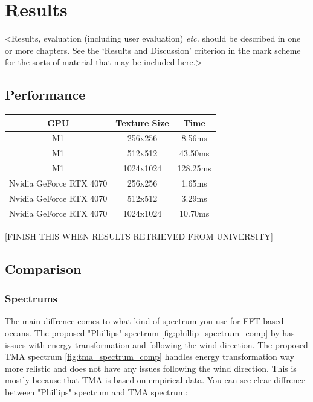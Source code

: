\justifying
\chapter{Results}
\label{chapter3}

<Results, evaluation (including user evaluation) {\em etc.} should be described in one or more chapters. See the `Results and Discussion' criterion in the mark scheme for the sorts of material that may be included here.>
\section{Performance}

\begin{table}[h]
    \centering
    \begin{tabular}{|c|c|c|}
        \hline
        \textbf{GPU} & \textbf{Texture Size} & \textbf{Time} \\
        \hline
        M1 & 256x256 & 8.56ms \\
        \hline
        M1 & 512x512 & 43.50ms \\
        \hline
        M1 & 1024x1024 & 128.25ms \\
        \hline
        Nvidia GeForce RTX 4070 & 256x256 & 1.65ms \\
        \hline
        Nvidia GeForce RTX 4070 & 512x512 & 3.29ms \\
        \hline
        Nvidia GeForce RTX 4070  & 1024x1024 & 10.70ms \\
        \hline
    \end{tabular}
\end{table}

[FINISH THIS WHEN RESULTS RETRIEVED FROM UNIVERSITY]

\section{Comparison} 

\subsection{Spectrums}
The main diffrence comes to what kind of spectrum you use for FFT based oceans. The proposed "Phillips" spectrum \ref{fig:phillip_spectrum_comp} by \cite[J. Tessendorf]{tessendorf2001} has issues with energy transformation and following the wind direction. 
The proposed TMA spectrum \ref{fig:tma_spectrum_comp} handles energy transformation way more relistic and does not have any issues following the wind direction. This is mostly because that TMA is based on empirical data.
You can see clear diffrence between "Phillips" spectrum and TMA spectrum:


